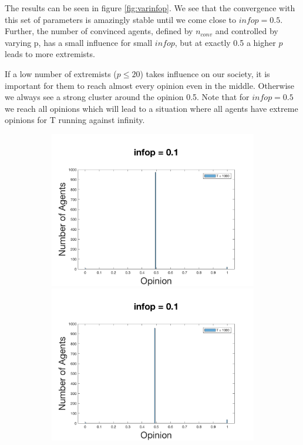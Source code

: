 \documentclass[11pt]{article}
\begin{document}
The results can be seen in figure \ref{fig:varinfop}. We see that the convergence with this set of parameters is amazingly stable until we come close to $infop = 0.5$. Further, the number of convinced agents, defined by $n_{conv}$ and controlled by varying p, has a small influence for small $infop$, but at exactly 0.5 a higher $p$ leads to more extremists.

If a low number of extremists ($p \leq 20$) takes influence on our society, it is important for them to reach almost every opinion even in the middle. Otherwise we always see a strong cluster around the opinion 0.5. Note that for $infop = 0.5$ we reach all opinions which will lead to a situation where all agents have extreme opinions for T running against infinity.

\begin{figure}[!htb]
\begin{subfigure}[t]{\textwidth}
  \includegraphics[width=\linewidth]{p_5/gen_plot_201712171365061157e+01.png}
\endminipage\hfill
{}
  \includegraphics[width=\linewidth]{p_10/gen_plot_2017121712593240672e+01.png}

\end{subfigure}
\end{figure}
\end{document}
